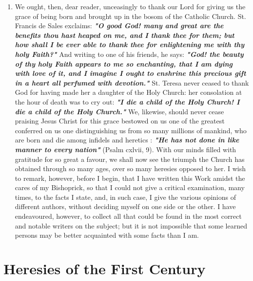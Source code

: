 \documentclass[12pt]{book}
\begin{document}
\begin{enumerate}
\item We ought, then, dear reader, unceasingly to thank our Lord for giving us the grace of being born and
brought up in the bosom of the Catholic Church. St. Francis de Sales exclaims: \textit{\textbf{ "O good God! many and
great are the benefits thou hast heaped on me, and I thank thee for them; but how shall I be ever able to
thank thee for enlightening me with thy holy Faith?"}} And writing to one of his friends, he says: \textit{\textbf{
"God! the beauty of thy holy Faith appears to me so enchanting, that I am dying with love of it, and I imagine I
ought to enshrine this precious gift in a heart all perfumed with devotion."}} St. Teresa never ceased to
thank God for having made her a daughter of the Holy Church: her consolation at the hour of death was
to cry out: \textit{\textbf{"I die a child of the Holy Church! I die a child of the Holy Church."}} We, likewise, should
never cease praising Jesus Christ for this grace bestowed on us one of the greatest conferred on us one
distinguishing us from so many millions of mankind, who are born and die among infidels and heretics :
\textit{\textbf{"He has not done in like manner to every nation"}} (Psalm cxlvii, 9). With our minds filled with gratitude
for so great a favour, we shall now see the triumph the Church has obtained through so many ages, over
so many heresies opposed to her. I wish to remark, however, before I begin, that I have written this Work
amidst the cares of my Bishoprick, so that I could not give a critical examination, many times, to the facts
I state, and, in such case, I give the various opinions of different authors, without deciding myself on one
side or the other. I have endeavoured, however, to collect all that could be found in the most correct and
notable writers on the subject; but it is not impossible that some learned persons may be better
acquainted with some facts than I am.
\end{enumerate}

\chapter{Heresies of the First Century}
\end{document}
